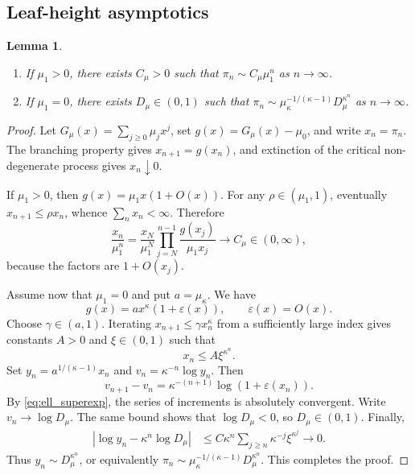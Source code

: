 \documentclass[a4paper,11pt]{article}
\newtheorem{lemma}[theorem]{Lemma}
\DeclareRobustCommand{\1}{\mathbf{1}}
\begin{document}
\subsection{Leaf-height asymptotics}
\label{sec:ell_asymp}


\begin{lemma}
  \label{lem:ell_asymp}
  \leavevmode
  \begin{enumerate}
    \item[(i)] If $\mu_1>0$, there exists $C_\mu>0$ such that
    $\pi_n\sim C_\mu\mu_1^n$ as $n\to\infty$.
    \item[(ii)] If $\mu_1=0$, there exists $D_\mu\in(0,1)$ such that
    $
      \pi_n
      \sim
      \mu_\kappa^{-1/(\kappa-1)}D_\mu^{\kappa^n}
    $
    as $n\to\infty$.
  \end{enumerate}
\end{lemma}

\begin{proof}
Let $G_\mu(x)=\sum_{j\ge0}\mu_jx^j$, set
$g(x)=G_\mu(x)-\mu_0$, and write $x_n=\pi_n$. The branching
property gives $x_{n+1}=g(x_n)$, and extinction of the critical
non-degenerate process gives $x_n\downarrow0$.

If $\mu_1>0$, then $g(x)=\mu_1x(1+O(x))$. For any
$\rho\in(\mu_1,1)$, eventually $x_{n+1}\le\rho x_n$, whence
$\sum_nx_n<\infty$. Therefore
$$
\frac{x_n}{\mu_1^n}
=\frac{x_N}{\mu_1^N}
\prod_{j=N}^{n-1}\frac{g(x_j)}{\mu_1x_j}
\longrightarrow C_\mu\in(0,\infty),
$$
because the factors are $1+O(x_j)$.

Assume now that $\mu_1=0$ and put $a=\mu_\kappa$. We have
$$
g(x)=ax^\kappa(1+\varepsilon(x)),
\qquad \varepsilon(x)=O(x).
$$
Choose $\gamma\in(a,1)$. Iterating
$x_{n+1}\le\gamma x_n^\kappa$ from a sufficiently large index gives
constants $A>0$ and $\xi\in(0,1)$ such that
\begin{equation}
\label{eq:ell_superexp}
x_n\le A\xi^{\kappa^n}.
\end{equation}
Set $
y_n=a^{1/(\kappa-1)}x_n$ and $v_n=\kappa^{-n}\log y_n.
$
Then
$$
v_{n+1}-v_n
=\kappa^{-(n+1)}\log(1+\varepsilon(x_n)).
$$
By \eqref{eq:ell_superexp}, the series of increments is absolutely
convergent. Write
$v_n\to\log D_\mu$. The same bound shows that $\log D_\mu<0$, so
$D_\mu\in(0,1)$. Finally,
\begin{align*}
\left|\log y_n-\kappa^n\log D_\mu\right|
&\le
C\kappa^n\sum_{j\ge n}\kappa^{-j}\xi^{\kappa^j}
\longrightarrow0.
\end{align*}
Thus $y_n\sim D_\mu^{\kappa^n}$, or equivalently
$
\pi_n
\sim\mu_\kappa^{-1/(\kappa-1)}D_\mu^{\kappa^n}
$. This completes the proof.
\end{proof}
\end{document}
